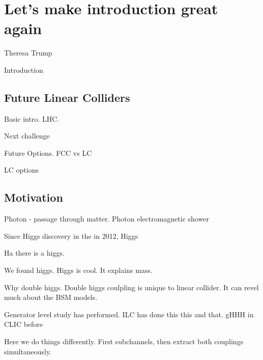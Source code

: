 \chapter{Let's make introduction great again}
\label{chap:SomeStuff}



%
{Theresa Trump}%

Introduction

\section{Future Linear Colliders}

Basic intro. LHC.

Next challenge

Future Options. FCC vs LC

LC options


\section{Motivation}



Photon - passage through matter. Photon electromagnetic shower


Since Higgs discovery in the \LHC in 2012, Higgs



Ha there is a higgs.

We found higgs. Higgs is cool. It explains mass.

Why double higgs. Double higgs coulpling is unique to linear collider. It can revel much about the BSM models.

Generator level study has performed. ILC has done this this and that. gHHH in CLIC before

Here we do things differently. First subchannels, then extract both couplings simultaneously.
